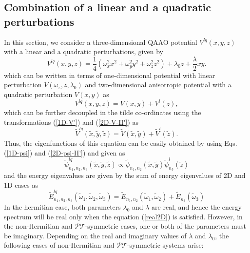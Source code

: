 \documentclass[a4paper, 12pt]{article}
\newcommand{\td}[1]{\tilde{#1}}
\begin{document}
\subsection{Combination of a linear and a quadratic perturbations}
In this section, we consider a three-dimensional QAAO potential $V^{lq}(x,y,z)$ with a linear and a quadratic perturbations, given by
\begin{equation}\label{3D-V-III}
V^{lq}(x,y,z) = \frac{1}{4} \left(\omega_{x}^2 x^2 + \omega_{y}^2 y^2 + \omega_{z}^2 z^2\right) + \lambda_{0} z + \frac{\lambda}{2} xy.
\end{equation}
which can be written in terms of one-dimensional potential with linear perturbation $V(\omega_{z},z,\lambda_0)$ and two-dimensional anisotropic potential with a quadratic perturbation $V(x,y)$ as 
\begin{equation}
  V^{lq}(x, y, z) =  V(x, y)+ V^l(z),
\end{equation}
which can be further decoupled in the tilde co-ordinates using the transformations (\ref{1D-V'}) and (\ref{2D-V-II'}) as
\begin{equation}
	\td{V}^{lq}(\td{x}, \td{y}, \td{z}) =  \td{V}(\td{x}, \td{y})+ \td{V}^l(\td{z}).
\end{equation}
 Thus, the eigenfunctions of this equation can be easily obtained by using Eqs.  (\ref{1D-psi}) and (\ref{2D-psi-II'}) and given as 
\begin{equation}\label{lq_ef}
  \td{\psi}^{lq}_{n_1, n_2, n_3}(\td{x}, \td{y}, \td{z}) \propto \td{\psi}_{n_1, n_2}(\td{x}, \td{y}) \td{\psi}^l_{n_3}( \td{z})
\end{equation}
and the energy eigenvalues are given by the sum of energy eigenvalues of 2D and 1D cases as
\begin{equation}\label{lq_en}
  \td{E}^{lq}_{n_1, n_2, n_3}(\td{\omega}_1, \td{\omega}_2, \td{\omega}_3) = \td{E}_{n_1, n_2}(\td{\omega}_1, \td{\omega}_2) + \td{E}_{n_3}(\td{\omega}_3)
\end{equation}
In the hermitian case, both parameters $\lambda_0$ and $\lambda$ are real, and hence the energy spectrum will be real only when the equation (\ref{real2D}) is satisfied. However, in the non-Hermitian and $\mathcal{PT}$-symmetric cases, one or both of the parameters must be imaginary.  Depending on the real and imaginary values of $\lambda$ and $\lambda_0$, the following cases of non-Hermitian and $\mathcal {PT}$-symmetric systems arise:
\end{document}
